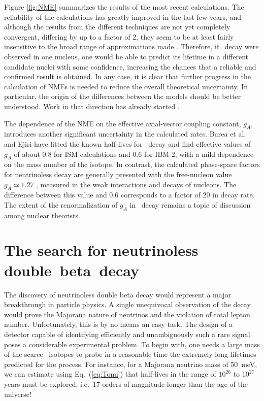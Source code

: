 \documentclass{PoS}
\begin{document}
Figure \ref{fig:NME} summarizes the results of the most recent calculations. The reliability of the calculations has greatly improved in the last few years, and although the results from the different techniques are not yet completely convergent, differing by up to a factor of 2, they seem to be at least fairly insensitive to the broad range of approximations made \cite{Vogel:2012ja}. Therefore, if \bbonu\ decay were observed in one nucleus, one would be able to predict its lifetime in a different candidate nuclei with some confidence, increasing the chances that a reliable and confirmed result is obtained. In any case, it is clear that further progress in the calculation of NMEs is needed to reduce the overall theoretical uncertainty. In particular, the origin of the differences between the models should be better understood. Work in that direction has already started \cite{Menendez:2014ena}.

The dependence of the NME on the effective axial-vector coupling constant, $g_{A}$, introduces another significant uncertainty in the calculated rates. Barea et al.\ \cite{Barea:2013bz} and Ejiri \cite{Ejiri:2010zza} have fitted the known half-lives for \bbtnu\ decay and find effective values of $g_{A}$ of about 0.8 for ISM calculations and 0.6 for IBM-2, with a mild dependence on the mass number of the isotope. In contrast, the calculated phase-space factors for neutrinoless decay are generally presented with the free-nucleon value $g_{A} \simeq1.27$ \cite{Agashe:2014kda}, measured in the weak interactions and decays of nucleons. The difference between this value and 0.6 corresponds to a factor of 20 in decay rate. The extent of the renormalization of $g_{A}$ in \bbonu\ decay remains a topic of discussion among nuclear theorists.
 
\section{The search for neutrinoless \mbox{double beta decay}} 


The discovery of neutrinoless double beta decay would represent a major breakthrough in particle physics. A single unequivocal observation of the decay would prove the Majorana nature of neutrinos and the violation of total lepton number. Unfortunately, this is by no means an easy task. The design of a detector capable of identifying efficiently and unambiguously such a rare signal poses a considerable experimental problem. To begin with, one needs a large mass of the scarce \bb\ isotopes to probe in a reasonable time the extremely long lifetimes predicted for the process. For instance, for a Majorana neutrino mass of 50~meV, we can estimate using Eq.~(\ref{eq:Tonu}) that half-lives in the range of $10^{26}$ to $10^{27}$ years must be explored, i.e.\ 17 orders of magnitude longer than the age of the universe! 
\end{document}
